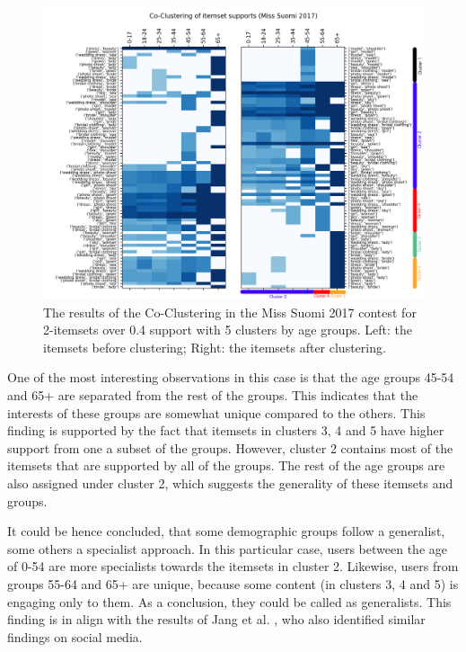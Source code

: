 \begin{figure}[h] 
    \begin{center}
        \includegraphics[width=1.0\textwidth]{Images/coclustering_miss-suomi-age_group-2-itemsets-04_support.png}
        \caption{The results of the Co-Clustering in the Miss Suomi 2017 contest for 2-itemsets over 0.4 support with 5 clusters by age groups. Left: the itemsets before clustering; Right: the itemsets after clustering.}
        \label{coclustering_miss-suomi-age_group-2-itemsets-04_support}
    \end{center}
\end{figure}

One of the most interesting observations in this case is that the age groups 45-54 and 65+ are separated from the rest of the groups. This indicates that the interests of these groups are somewhat unique compared to the others. This finding is supported by the fact that itemsets in clusters 3, 4 and 5 have higher support from one a subset of the groups. However, cluster 2 contains most of the itemsets that are supported by all of the groups. The rest of the age groups are also assigned under cluster 2, which suggests the generality of these itemsets and groups. 

It could be hence concluded, that some demographic groups follow a generalist, some others a specialist approach. In this particular case, users between the age of 0-54 are more specialists towards the itemsets in cluster 2. Likewise, users from groups 55-64 and 65+ are unique, because some content (in clusters 3, 4 and 5) is engaging only to them. As a conclusion, they could be called as generalists. This finding is in align with the results of Jang et al. \cite{jang2015no}, who also identified similar findings on social media. 

